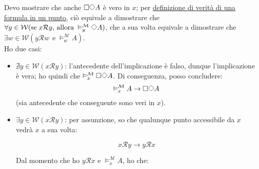 \documentclass[a4paper,12pt]{article}
\newcommand{\Dmd}{\mathord{\vcenter{\hbox{\tikz[baseline=-0.6ex]{\draw[line width=0.4pt, scale=1, rotate=45] (0,0) rectangle (0.2,0.2);}}}}} %
\begin{document}
\begin{dimo}
\begin{enumerate}
		      Devo mostrare che anche $\Box \Dmd A$ è vero in $x$; per \hyperlink{defverp}{definizione di verità di una formula in un punto}, ciò equivale a dimostrare che $\forall y \in \mathcal{W} (\text{se} \; x\mathcal{R}y  \text{, allora} \; \vDash_y^{\mathcal{M}} \Dmd A)$, che a sua volta equivale a dimostrare che $\exists w \in \mathcal{W} (y\mathcal{R}w \;\, \text{e} \; \vDash_w^{\mathcal{M}} A)$.\\
		      Ho due casi:
		      \begin{itemize}
			      \item $\nexists y \in \mathcal{W} (x\mathcal{R}y)$: l'antecedente dell'implicazione è falso, dunque l'implicazione è vera; ho quindi che $\vDash_x^{\mathcal{M}} \Box \Dmd A$. Di conseguenza, posso concludere:
			            $$\vDash_x^{\mathcal{M}} A \to \Box \Dmd A$$
			            (sia antecedente che conseguente sono veri in $x$).
			      \item $\exists y \in \mathcal{W} (x\mathcal{R}y)$: per assunzione, so che qualunque punto accessibile da $x$ vedrà $x$ a sua volta:

			            \begin{minipage}{0.48\textwidth}
				            $$x\mathcal{R}y \to y\mathcal{R}x$$
			            \end{minipage}
			            \begin{minipage}{0.48\textwidth}
				            \begin{center}
				            \end{center}
			            \end{minipage}
			            \vspace{0pt}

			            Dal momento che ho $y\mathcal{R}x$ e $\vDash_x^{\mathcal{M}} A$, ho che: \\


\end{itemize}
\end{enumerate}
\end{dimo}
\end{document}
